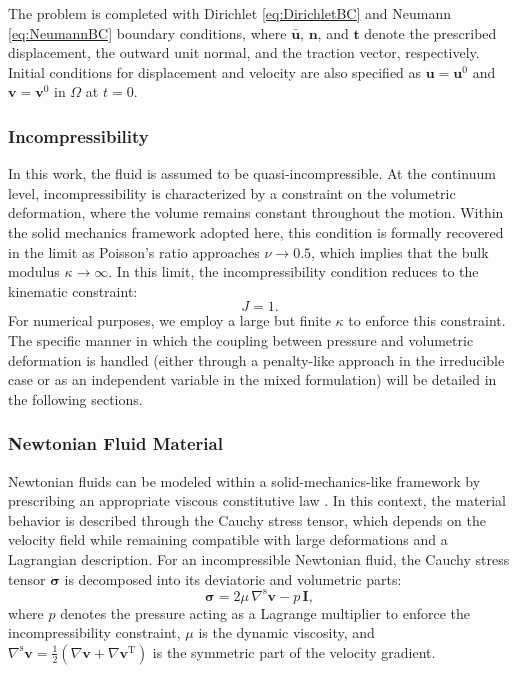 \documentclass[11pt,english]{article}
\def\InitialDomain{\Omega}
\def\disp{\boldsymbol{u}}
\def\t{\boldsymbol{t}}
\begin{document}
    The problem is completed with Dirichlet \eqref{eq:DirichletBC} and Neumann \eqref{eq:NeumannBC} boundary conditions, where $\bar{\boldsymbol{u}}$, $\boldsymbol{n}$, and $\t$ denote the prescribed displacement, the outward unit normal, and the traction vector, respectively. Initial conditions for displacement and velocity are also specified as $\disp = \disp^0$ and $\boldsymbol{v} = \boldsymbol{v}^0$ in $\InitialDomain$ at $t=0$.

\subsubsection{Incompressibility \label{sec:incompressibility}}

    In this work, the fluid is assumed to be quasi-incompressible. At the continuum level, incompressibility is characterized by a constraint on the volumetric deformation, where the volume remains constant throughout the motion. Within the solid mechanics framework adopted here, this condition is formally recovered in the limit as Poisson’s ratio approaches $\nu \to 0.5$, which implies that the bulk modulus $\kappa \to \infty$. In this limit, the incompressibility condition reduces to the kinematic constraint:
    \begin{equation*}
        J = 1.
    \end{equation*}
    For numerical purposes, we employ a large but finite $\kappa$ to enforce this constraint. The specific manner in which the coupling between pressure and volumetric deformation is handled (either through a penalty-like approach in the irreducible case or as an independent variable in the mixed formulation) will be detailed in the following sections.


\subsubsection{Newtonian Fluid Material \label{sec:newtonian_material}}

    Newtonian fluids can be modeled within a solid-mechanics-like framework by prescribing an appropriate viscous constitutive law \cite{reiner1945mathematical}. In this context, the material behavior is described through the Cauchy stress tensor, which depends on the velocity field while remaining compatible with large deformations and a Lagrangian description.
    \noindent For an incompressible Newtonian fluid, the Cauchy stress tensor $\boldsymbol{\sigma}$ is decomposed into its deviatoric and volumetric parts:
    \begin{equation*}
        \boldsymbol{\sigma} = 2\mu\, \nabla^{\mathrm{s}}\boldsymbol{v} - p\,\mathbf{I},
    \end{equation*}
    where $p$ denotes the pressure acting as a Lagrange multiplier to enforce the incompressibility constraint, $\mu$ is the dynamic viscosity, and $\nabla^{\mathrm{s}}\boldsymbol{v} = \frac{1}{2}(\nabla \boldsymbol{v} + \nabla \boldsymbol{v}^{\mathrm{T}})$ is the symmetric part of the velocity gradient.
    
\end{document}
